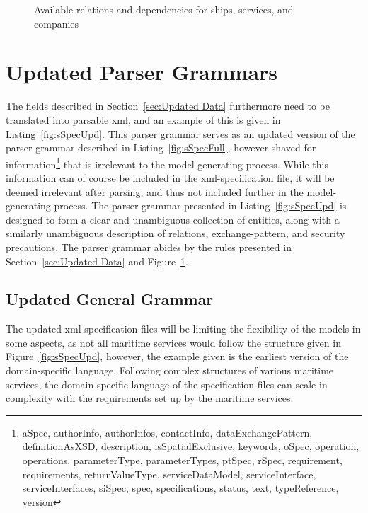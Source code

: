 \begin{figure}
	\caption{Available relations and dependencies for ships, services, and companies}
	\label{fig:entities}
\end{figure}


\section{Updated Parser Grammars}

The fields described in Section~\ref{sec:Updated Data} furthermore need to be translated into parsable xml, and an example of this is given in Listing~\ref{fig:sSpecUpd}. This parser grammar serves as an updated version of the parser grammar described in Listing~\ref{fig:sSpecFull}, however shaved for information\footnote{aSpec, authorInfo, authorInfos, contactInfo, dataExchangePattern, definitionAsXSD, description, isSpatialExclusive, keywords, oSpec, operation, operations, parameterType, parameterTypes, ptSpec, rSpec, requirement, requirements, returnValueType, serviceDataModel, serviceInterface, serviceInterfaces, siSpec, spec, specifications, status, text, typeReference, version} that is irrelevant to the model-generating process. While this information can of course be included in the xml-specification file, it will be deemed irrelevant after parsing, and thus not included further in the model-generating process. The parser grammar presented in Listing~\ref{fig:sSpecUpd} is designed to form a clear and unambiguous collection of entities, along with a similarly unambiguous description of relations, exchange-pattern, and security precautions. The parser grammar abides by the rules presented in Section~\ref{sec:Updated Data} and Figure~\ref{fig:entities}.

\subsection{Updated General Grammar}
The updated xml-specification files will be limiting the flexibility of the models in some aspects, as not all maritime services would follow the structure given in Figure~\ref{fig:sSpecUpd}, however, the example given is the earliest version of the domain-specific language. Following complex structures of various maritime services, the domain-specific language of the specification files can scale in complexity with the requirements set up by the maritime services.

